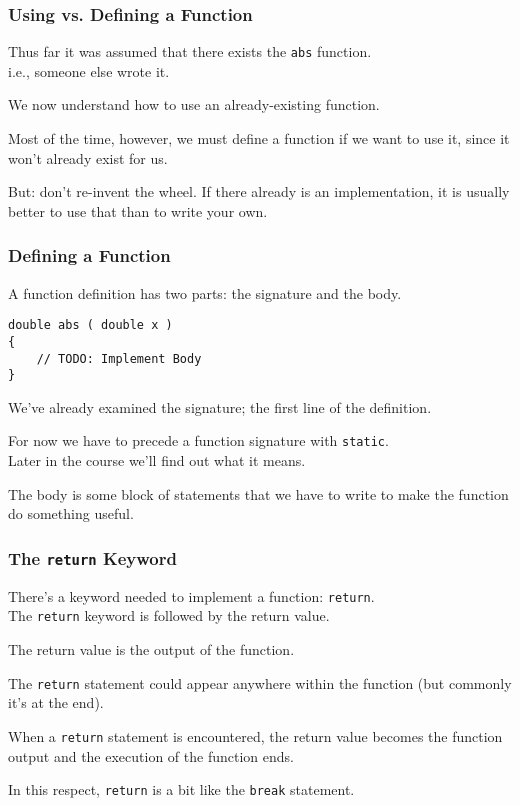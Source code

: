 \begin{frame}
\frametitle{Using vs. Defining a Function}
Thus far it was assumed that there exists the \texttt{abs} function.\\
\quad i.e., someone else wrote it.

We now understand how to use an already-existing function.

Most of the time, however, we must define a function if we want to use it, since it won't already exist for us.

But: don't re-invent the wheel. If there already is an implementation, it is usually better to use that than to write your own.

\end{frame}

\begin{frame}[fragile]
\frametitle{Defining a Function}


A function definition has two parts: the signature and the body.

\begin{verbatim}
double abs ( double x ) 
{
    // TODO: Implement Body
}
\end{verbatim}

We've already examined the signature; the first line of the definition.

For now we have to precede a function signature with \texttt{static}.\\
\quad Later in the course we'll find out what it means.

The body is some block of statements that we have to write to make the function do something useful.

\end{frame}

\begin{frame}
\frametitle{The \texttt{return} Keyword}

There's a keyword needed to implement a function: \texttt{return}.\\
\quad The \texttt{return} keyword is followed by the \alert{return value}.

The return value is the output of the function.

The \texttt{return} statement could appear anywhere within the function (but commonly it's at the end).

When a \texttt{return} statement is encountered, the return value becomes the function output and the execution of the function ends.

In this respect, \texttt{return} is a bit like the \texttt{break} statement.

\end{frame}

